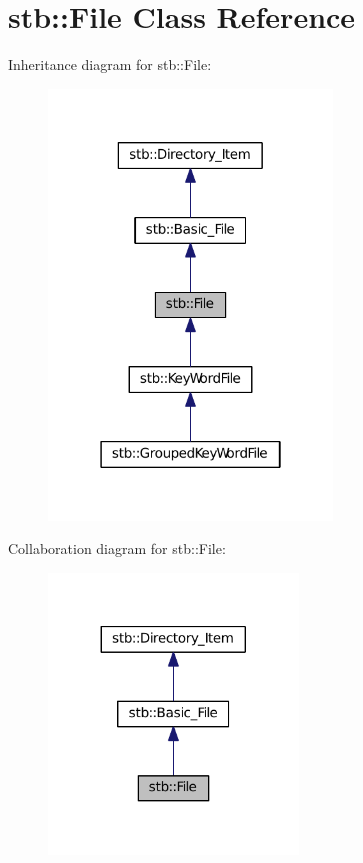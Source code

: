 \hypertarget{classstb_1_1File}{\section{stb\+:\+:File Class Reference}
\label{classstb_1_1File}
}


Inheritance diagram for stb\+:\+:File\+:
\nopagebreak
\begin{figure}[H]
\begin{center}
\leavevmode
\includegraphics[width=214pt]{classstb_1_1File__inherit__graph}
\end{center}
\end{figure}


Collaboration diagram for stb\+:\+:File\+:
\nopagebreak
\begin{figure}[H]
\begin{center}
\leavevmode
\includegraphics[width=188pt]{classstb_1_1File__coll__graph}
\end{center}
\end{figure}
